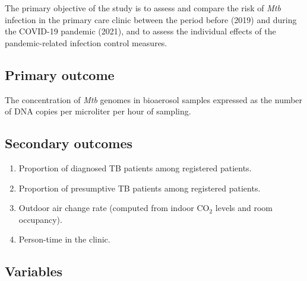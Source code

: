 \documentclass{article}
\begin{document}
The primary objective of the study is to assess and compare the risk of \emph{Mtb} infection in the primary care clinic between the period before (2019) and during the COVID-19 pandemic (2021), and to assess the individual effects of the pandemic-related infection control measures. 

\subsection{Primary outcome}

The concentration of \emph{Mtb} genomes in bioaerosol samples expressed as the number of DNA copies per microliter per hour of sampling.  


\subsection{Secondary outcomes}

\begin{enumerate}
    \item Proportion of diagnosed TB patients among registered patients.
    \item Proportion of presumptive TB patients among registered patients.
    \item Outdoor air change rate (computed from indoor CO$_2$ levels and room occupancy).
    \item Person-time in the clinic. 
\end{enumerate}

\subsection{Variables}
\end{document}
